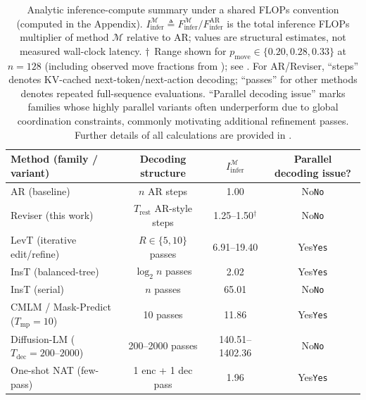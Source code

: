 \documentclass[11pt]{article}
\newcommand{\TokG}[1]{\begingroup\color{TokGreen}\ifmmode #1\else\texttt{#1}\fi\endgroup}
\newcommand{\TokR}[1]{\begingroup\color{TokRed}\ifmmode #1\else\texttt{#1}\fi\endgroup}
\begin{document}
\begin{table}[tbp]
\centering
\small
\setlength{\tabcolsep}{6pt}
\begin{tabular}{lccc}
\toprule
Method (family / variant) & Decoding structure & $I_{\text{infer}}^{\mathcal{M}}$ & Parallel decoding issue? \\
\midrule
AR (baseline) & $n$ AR steps & \num{1.00} & \TokG{No} \\
Reviser (this work) & $T_{\text{rest}}$ AR-style steps & \num{1.25}--\num{1.50}$^{\dagger}$ & \TokG{No} \\
\midrule
LevT (iterative edit/refine) & $R\in\{5,10\}$ passes & \num{6.91}--\num{19.40} & \TokR{Yes} \\
InsT (balanced-tree) & $\log_2 n$ passes & \num{2.02} & \TokR{Yes} \\
InsT (serial) & $n$ passes & \num{65.01} & \TokG{No} \\
CMLM / Mask-Predict ($T_{\text{mp}}{=}10$) & 10 passes & \num{11.86} & \TokR{Yes} \\
Diffusion-LM ($T_{\text{dec}}{=}200$--$2000$) & 200--2000 passes & \num{140.51}--\num{1402.36} & \TokG{No} \\
\midrule
One-shot NAT (few-pass) & 1 enc + 1 dec pass & \num{1.96} & \TokR{Yes} \\
\bottomrule
\end{tabular}
\caption{Analytic inference-compute summary under a shared FLOPs convention (computed in the Appendix).
$I_{\text{infer}}^{\mathcal{M}} \triangleq F_{\text{infer}}^{\mathcal{M}}/F_{\text{infer}}^{\text{AR}}$ is the total inference FLOPs multiplier of method $\mathcal{M}$ relative to AR; values are structural estimates, not measured wall-clock latency.
$\dagger$~Range shown for $p_{\text{move}}\in\{0.20,0.28,0.33\}$ at $n=128$ (including observed move fractions from ); see .
For AR/Reviser, ``steps'' denotes KV-cached next-token/next-action decoding; ``passes'' for other methods denotes repeated full-sequence evaluations.
``Parallel decoding issue'' marks families whose highly parallel variants often underperform due to global coordination constraints, commonly motivating additional refinement passes. Further details of all calculations are provided in .}
\label{tab:prior_art_summary_main}
\end{table}
\end{document}
